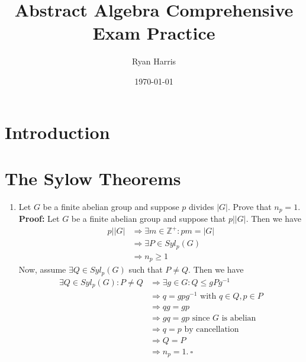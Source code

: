 \documentclass{article}
\title{Abstract Algebra Comprehensive Exam Practice}
\author{Ryan Harris}
\date{\today}
\begin{document}
\maketitle

\setcounter{section}{-1}
\section{Introduction}

\newpage

\section{The Sylow Theorems}

\begin{enumerate}
    \item Let $G$ be a finite abelian group and suppose $p$ divides $|G|$. Prove that $n_p = 1$.\\
    \textbf{Proof:} Let $G$ be a finite abelian group and suppose that $p \big| |G|$. Then we have
    \begin{align*}
        p \big| |G| &\Longrightarrow \exists m \in \mathbb{Z}^+:pm=|G| \\
        &\Longrightarrow \exists P \in Syl_p(G) \\
        &\Longrightarrow n_p \geq 1
    \end{align*}
    Now, assume $\exists Q \in Syl_p(G)$ such that $P \neq Q$. Then we have
    \begin{align*}
        \exists Q \in Syl_p(G): P \neq Q &\Longrightarrow \exists g \in G: Q \leq gPg^{-1} \\
        &\Longrightarrow q = gpg^{-1} \text{ with }q \in Q, p \in P \\
        &\Longrightarrow qg = gp \\
        &\Longrightarrow gq = gp \text{ since } G \text{ is abelian} \\
        &\Longrightarrow q = p \text{ by cancellation } \\
        &\Longrightarrow Q = P \\
        &\Longrightarrow n_p = 1. \ \square
    \end{align*}


\end{enumerate}
\end{document}
